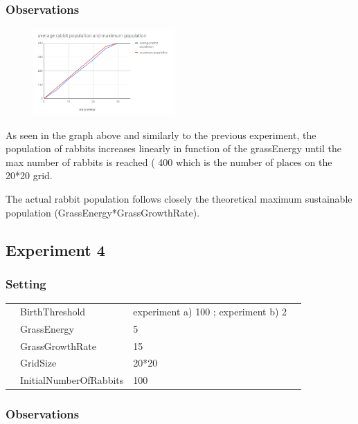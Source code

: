 \documentclass[11pt]{article}
\begin{document}
 \subsubsection{Observations}
  \begin{figure}
  \vspace{-20pt}
  \begin{center}
    \includegraphics[width=0.48\textwidth]{grassenergy.png}
  \end{center}
  \vspace{-20pt}
\end{figure}

 As seen in the graph above and similarly to the previous experiment, the population of rabbits increases linearly in function of the grassEnergy until the max number of rabbits is reached ( 400 which is the number of places on the 20*20 grid.

 The actual rabbit population follows closely the theoretical maximum sustainable population (GrassEnergy*GrassGrowthRate).

 \subsection{Experiment 4}
 \subsubsection{Setting}
 \begin{table}[H]
  \begin{tabular}{llll}
   &BirthThreshold  &experiment a) 100 ; experiment b) 2\\
   &GrassEnergy  &5\\
   &GrassGrowthRate  &15\\
   &GridSize  &20*20\\
   &InitialNumberOfRabbits  &100
  \end{tabular}
 \end{table}

 \subsubsection{Observations}
\end{document}
